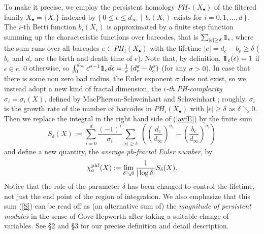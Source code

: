 \documentclass[12pt]{amsart}
\numberwithin{equation}{section}
\newcommand\jeden {1\hskip-3.5pt1}
\begin{document}
To make it precise, we employ the persistent homology $PH_*(X_\bullet)$  of the filtered family $X_\bullet=\{X_\epsilon\}$ indexed by  
$\{\, 0\le \epsilon \le d_\infty \, \mid \,  \mbox{$b_i(X_\epsilon)$ exists for $i=0,1,\dots, d$}\, \}$.  The $i$-th Betti function $b_i(X_\epsilon)$ is approximated by a finite step function summing up the characteristic functions over barcodes, that is $\sum_{|e|\ge \delta} \jeden_\epsilon$, where the sum runs over all barcodes $e \in PH_i(X_\bullet)$ with the lifetime $|e|=d_e-b_e \ge \delta$ ($b_e$ and $d_e$ are the birth and death time of $e$). Note that, by definition,  $\jeden_e(\epsilon)=1$ if $\epsilon \in e$, $0$ otherwise, so $\int_0^{d_\infty} \epsilon^{\sigma-1} \jeden_e d\epsilon
=\frac{1}{\sigma}\left(d_e^{\sigma}-b_e^{\sigma}\right)$ (for any $\sigma>0$). 
In case that  there is some non zero bad radius,  the Euler exponent $\sigma$ does not exist, so we instead adopt a new kind of fractal dimension, the {\em $i$-th PH-complexity} $\sigma_i=\sigma_i(X)$, defined by MacPherson-Schweinhart \cite{MS12} and Schweinhart \cite{S21}; roughly, $\sigma_i$ is the growth rate of the number of barcodes in $PH_i(X_\bullet)$ with $|e| \ge \delta$ as $\delta \searrow 0$. 
Then we replace the integral in the right hand side of (\ref{avfE}) by the finite sum 
\begin{equation}\label{S}
S_\delta (X):=
\sum_{i=0}^d \frac{(-1)^i}{\sigma_i} 
\sum_{|e|\ge \delta} \; \left(\left(\frac{d_e}{d_\infty}\right)^{\sigma_i}-\left(\frac{b_e}{d_\infty}\right)^{\sigma_i}\right)
\end{equation}
and define a new quantity, the {\em average ph-fractal Euler number}, by 
\begin{equation}\label{phfS}
\chi_{a}^{\rm phf}(X):= \lim_{\delta \searrow 0} \frac{1}{|\log \delta|} S_\delta(X). 
\end{equation}
Notice that the role of the parameter $\delta$ has been changed to control the lifetime, not just the end point of the region of integration. 
We also emphasize that this sum (\ref{S}) can be read off as (an alternative sum of) the {\em magnitude of persistent modules} in the sense of Govc-Hepworth \cite{GH21} after taking a suitable change of variables. See \S 2 and \S 3 for our precise definition and detail description. 
\end{document}
